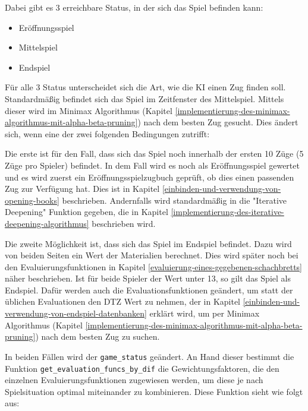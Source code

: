     Dabei gibt es 3 erreichbare Status, in der sich das Spiel befinden kann:

\begin{itemize}
\tightlist
\item
  Eröffnungsspiel
\item
  Mittelspiel
\item
  Endspiel
\end{itemize}

Für alle 3 Status unterscheidet sich die Art, wie die KI einen Zug
finden soll. Standardmäßig befindet sich das Spiel im Zeitfenster des
Mittelspiel. Mittels dieser wird im Minimax
Algorithmus (Kapitel \ref{implementierung-des-minimax-algorithmus-mit-alpha-beta-pruning}) nach dem besten Zug gesucht. Dies ändert sich, wenn
eine der zwei folgenden Bedingungen zutrifft:

Die erste ist für den Fall, dass sich das Spiel noch innerhalb der
ersten 10 Züge (5 Züge pro Spieler) befindet. In dem Fall wird es noch
als Eröffnungsspiel gewertet und es wird zuerst ein
Eröffnungsspielzugbuch geprüft, ob dies einen passenden Zug zur
Verfügung hat. Dies ist in Kapitel \ref{einbinden-und-verwendung-von-opening-books} beschrieben. Andernfalls wird
standardmäßig in die "Iterative Deepening" Funktion gegeben, die in
Kapitel \ref{implementierung-des-iterative-deepening-algorithmus} beschrieben wird.

Die zweite Möglichkeit ist, dass sich das Spiel im Endspiel befindet.
Dazu wird von beiden Seiten ein Wert der Materialien berechnet. Dies
wird später noch bei den Evaluierungsfunktionen in Kapitel \ref{evaluierung-eines-gegebenen-schachbretts} näher
beschrieben. Ist für beide Spieler der Wert unter 13, so gilt das Spiel
als Endspiel. Dafür werden auch die Evaluationsfunktionen geändert, um
statt der üblichen Evaluationen den DTZ Wert zu nehmen, der in Kapitel
\ref{einbinden-und-verwendung-von-endspiel-datenbanken} erklärt wird, um per Minimax Algorithmus (Kapitel \ref{implementierung-des-minimax-algorithmus-mit-alpha-beta-pruning}) nach dem besten
Zug zu suchen.

In beiden Fällen wird der \texttt{game\_status} geändert. An Hand dieser
bestimmt die Funktion \texttt{get\_evaluation\_funcs\_by\_dif} die
Gewichtungsfaktoren, die den einzelnen Evaluierungsfunktionen zugewiesen
werden, um diese je nach Spielsituation optimal miteinander zu
kombinieren. Diese Funktion sieht wie folgt aus:

